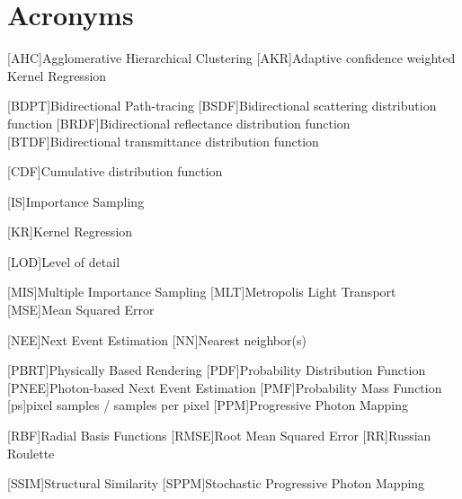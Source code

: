 \chapter*{Acronyms}

\begin{acronym}[ECU]


[AHC]{Agglomerative Hierarchical Clustering}
[AKR]{Adaptive confidence weighted Kernel Regression}

[BDPT]{Bidirectional Path-tracing}
[BSDF]{Bidirectional scattering distribution function}
[BRDF]{Bidirectional reflectance distribution function}
[BTDF]{Bidirectional transmittance distribution function}

[CDF]{Cumulative distribution function}

[IS]{Importance Sampling}

[KR]{Kernel Regression}

[LOD]{Level of detail}

[MIS]{Multiple Importance Sampling}
[MLT]{Metropolis Light Transport}
[MSE]{Mean Squared Error}


[NEE]{Next Event Estimation}
[NN]{Nearest neighbor(s)}

[PBRT]{Physically Based Rendering}
[PDF]{Probability Distribution Function}
[PNEE]{Photon-based Next Event Estimation}
[PMF]{Probability Mass Function}
[ps]{pixel samples / samples per pixel}
[PPM]{Progressive Photon Mapping}

[RBF]{Radial Basis Functions}
[RMSE]{Root Mean Squared Error}
[RR]{Russian Roulette}


[SSIM]{Structural Similarity}
[SPPM]{Stochastic Progressive Photon Mapping}

\end{acronym}
